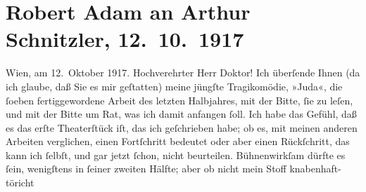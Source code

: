 

         
         \renewcommand{\erwaehntePersonen}{Personen: Robert Adam}
         \renewcommand{\erwaehnteInstitutionen}{Institutionen: Burgtheater, Nationaltheater München}
         \renewcommand{\erwaehnteOrte}{Orte: Wien}
         \renewcommand{\erwaehnteWerke}{Werke: Das Ende des Judas}
               \section[Robert Adam an Arthur Schnitzler, 12. 10. 1917]{ Robert Adam an Arthur Schnitzler, 12. 10. 1917}\nopagebreak{}\rehead{ }\begin{ledgroupsized}[t]{13cm}\normalsize\beginnumbering{} \toendnotes[C]{\smallbreak\pagebreak[2]} 
\pstart
           \raggedleft{}{\pb}Wien, am 12. Oktober
                  1917.\pend
           \pstart{}Hochverehrter Herr Doktor!\pend\pstart
           Ich überſende Ihnen (da ich glaube, daß Sie es mir geſtatten) meine jüngſte
               Tragikomödie, »Juda«, die ſoeben fertiggewordene
               Arbeit des letzten Halbjahres, mit der Bitte, ſie zu leſen, und mit der Bitte um Rat,
               was ich damit anfangen ſoll. Ich habe das Gefühl, daß es das erſte Theaterſtück iſt,
               das ich geſchrieben habe; ob es, mit meinen anderen Arbeiten verglichen, einen
               Fortſchritt bedeutet oder aber einen Rückſchritt, das kann ich ſelbſt, und gar jetzt
               ſchon, nicht beurteilen. Bühnenwirkſam dürfte es ſein, wenigſtens in ſeiner zweiten
               Hälfte; aber ob nicht mein Stoff {\pb}knabenhaft-töricht

\end{ledgroupsized}
